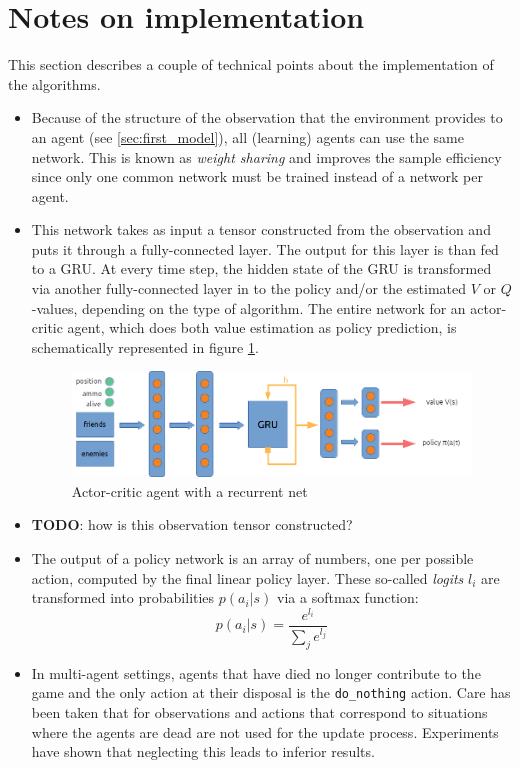\section{Notes on implementation}
This section describes a couple of technical points about the implementation of the algorithms.
\begin{itemize}
    \item Because of the structure of the observation that the environment provides to an agent (see \ref{sec:first_model}), all (learning) agents can use the same network. This is known as \emph{weight sharing} and improves the sample efficiency since only one common network must be trained instead of a network per agent.
    \item This network takes as input a tensor constructed from the observation and puts it through a fully-connected layer. The output for this layer is than fed to a GRU. At every time step, the hidden state of the GRU is transformed via another fully-connected layer in to the policy and/or the estimated $V$ or $Q$-values, depending on the type of algorithm. The entire network for an actor-critic agent, which does both value estimation as policy prediction, is schematically represented in figure \ref{fig:agent_net}. 
    \begin{figure}[htp]
        \centering
        \includegraphics[width=14cm]{images/agent_net2.png}
        \caption{Actor-critic agent with a recurrent net}
        \label{fig:agent_net}
    \end{figure}
    \item \textbf{TODO}: how is this observation tensor constructed?
    \item
        The output of a policy network is an array of numbers, one per possible action, computed by the final linear policy layer. These so-called \emph{logits} $l_i$ are transformed into probabilities $p(a_i | s)$ via a softmax function:
        \begin{equation}
            p(a_i | s) = \frac{e^{l_i}}{\sum_j e^{l_j}}
        \end{equation}
    \item In multi-agent settings, agents that have died no longer contribute to the game and the only action at their disposal is the {\tt do\_nothing} action. Care has been taken that for observations and actions that correspond to situations where the agents are dead are not used for the update process. Experiments have shown that neglecting this leads to inferior results.

\end{itemize}
